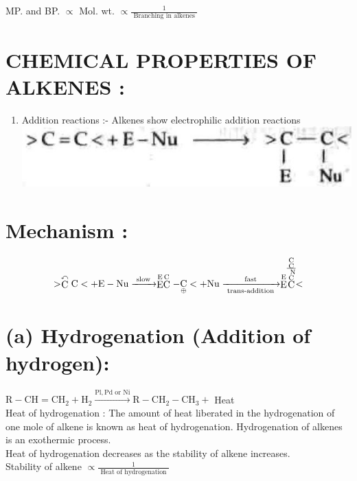 \documentclass[10pt]{article}
\begin{document}
MP. and BP. $\propto$ Mol. wt. $\propto \frac{1}{\text { Branching in alkenes }}$

\section*{CHEMICAL PROPERTIES OF ALKENES :}
\begin{enumerate}
  \item Addition reactions :- Alkenes show electrophilic addition reactions\\
\includegraphics[max width=\textwidth, center]{2025_01_28_8470952b98110cec3aabg-179}
\end{enumerate}

\section*{Mechanism :}
$$
>\stackrel{\curvearrowleft}{\mathrm{C}} \mathrm{C}<+\mathrm{E}-\mathrm{Nu} \xrightarrow{\text { slow }} \stackrel{\mathrm{E}}{\mathrm{E}} \stackrel{\mathrm{C}}{\mathrm{C}}-\underset{\oplus}{\mathrm{C}}<+\mathrm{Nu} \xrightarrow[\text { trans-addition }]{\text { fast }} \stackrel{\mathrm{E}}{\mathrm{E}} \stackrel{\substack{\mathrm{C} \\ \mathrm{C} \\ \hline \\ \mathrm{~N} \\ \mathrm{C}}}{\mathrm{C}}<
$$

\section*{(a) Hydrogenation (Addition of hydrogen):}
$\mathrm{R}-\mathrm{CH}=\mathrm{CH}_{2}+\mathrm{H}_{2} \xrightarrow{\mathrm{Pl}, \mathrm{Pd} \text { or } \mathrm{Ni}} \mathrm{R}-\mathrm{CH}_{2}-\mathrm{CH}_{3}+$ Heat\\
Heat of hydrogenation : The amount of heat liberated in the hydrogenation of one mole of alkene is known as heat of hydrogenation. Hydrogenation of alkenes is an exothermic process.\\
Heat of hydrogenation decreases as the stability of alkene increases.\\
Stability of alkene $\propto \frac{1}{\text { Heat of hydrogenation }}$
\end{document}
